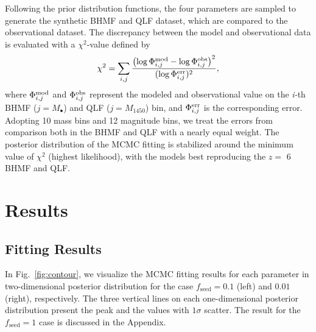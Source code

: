 \documentclass[twocolumn, twocolappendix]{aastex63}
\newcommand{\Mbh}{M_\bullet}
\newcommand{\fseed}{f_\mathrm{seed}}
\newcommand{\Muv}{M_{1450}}
\begin{document}
\begin{CJK*}{UTF8}{gbsn}
  

Following the prior distribution functions, the four parameters are sampled to generate the synthetic 
BHMF and QLF dataset, which are compared to the observational dataset. 
The discrepancy between the model and observational data is evaluated with a $\chi^2$-value defined by
\begin{align}
  \chi^2 = \sum_{i,j}
  \frac{\left(\log{\Phi^{\rm mod}_{i,j}} - \log{\Phi^{\rm obs}_{i,j}}\right)^2}{(\log{\Phi^{\rm err}_{i,j}})^2},
\end{align}
where $\Phi^{\rm mod}_{i,j}$ and $\Phi^{\rm obs}_{i,j}$ represent the modeled and observational value 
on the \textit{i-}th BHMF ($j=\Mbh$) and QLF ($j=\Muv$) bin, and $\Phi^{\rm err}_{i,j}$ is the corresponding error.
Adopting 10 mass bins and 12 magnitude bins, we treat the errors from comparison both in the BHMF and QLF
with a nearly equal weight.
The posterior distribution of the MCMC fitting is stabilized around the minimum value of $\chi^2$ (highest likelihood), 
with the models best reproducing the $z=$ 6 BHMF and QLF.



\vspace{5mm}
\section{Results}\label{sec:result}

\vspace{2mm}
\subsection{Fitting Results}\label{sec:fitting_result}
In Fig.~\ref{fig:contour}, we visualize the MCMC fitting results for each parameter in two-dimensional 
posterior distribution for the case $\fseed= 0.1$ (left) and $0.01$ (right), respectively.
The three vertical lines on each one-dimensional posterior distribution present the peak and the values
with $1\sigma$ scatter.
The result for the $\fseed=1$ case is discussed in the Appendix.



\end{CJK*}
\end{document}
